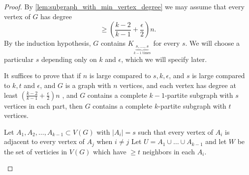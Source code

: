 \begin{proof}
By \cref{lem:subgraph_with_min_vertex_degree} we may assume that every vertex of $G$ has degree
\[	
\geq \left(  \frac{k-2}{k-1} + \frac{\epsilon}{2} \right)n.
\]
By the induction hypothesis, $G$ contains $K_{\underbrace{s,\dotsc,s}_{k-1 \text{ times}}}$ for every $s$. We will choose a particular $s$ depending only on $k$ and $\epsilon$, which we will specify later.

It suffices to prove that if $n$ is large compared to $s,k, \epsilon$, and $s$ is large compared to $k, t$ and $\epsilon$, and $G$ is a graph with $n$ vertices, and each vertex has degree at least $\left(  \frac{k-2}{k-1} + \frac{\epsilon}{2} \right)n$ , and $G$ contains a complete $k-1$-partite subgraph with $s$ vertices in each part, then $G$ contains a complete $k$-partite subgraph with $t$ vertices.

Let $A_1,A_2,\dotsc,A_{k-1} \subset V(G)$ with $|A_i| = s$ such that every vertex of $A_i$ is adjacent to every vertex of $A_j$ when $i\neq j$ 
Let $U = A_1\cup \dotsc \cup A_{k-1}$ and let $W$ be the set of verticies in $V(G)$ which have $\geq t$ neighbors in each $A_i$.

\begin{figure}
\begin{center}
\end{center}
\end{figure}
\end{proof}
